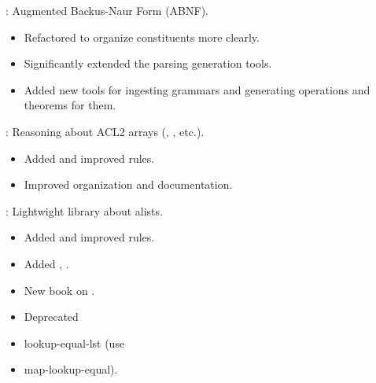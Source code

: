 \begin{frame}

\implibtitle

:
Augmented Backus-Naur Form (ABNF).
\begin{itemize}
\item Refactored to organize constituents more clearly.
\item Significantly extended the parsing generation tools.
\item Added new tools for ingesting grammars
      and generating operations and theorems for them.
\end{itemize}

\end{frame}


\begin{frame}

\implibtitle

:
Reasoning about ACL2 arrays (, , etc.).
\begin{itemize}
\item Added and improved rules.
\item Improved organization and documentation.
\end{itemize}

\end{frame}


\begin{frame}

\implibtitle

:
Lightwight library about alists.
\begin{itemize}
\item Added and improved rules.
\item Added , .
\item New book on .
\item Deprecated \item{lookup-equal-lst} (use \item{map-lookup-equal}).
\end{itemize}

\end{frame}


